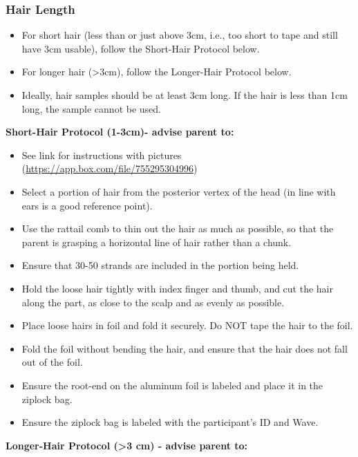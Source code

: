 \documentclass[
]{book}
\providecommand{\tightlist}{%
  \setlength{\itemsep}{0pt}\setlength{\parskip}{0pt}}
\begin{document}
\hypertarget{hair-length-1}{%
\subsubsection{Hair Length}\label{hair-length-1}}

\begin{itemize}
\tightlist
\item
  For short hair (less than or just above 3cm, i.e., too short to tape and still have 3cm usable), follow the Short-Hair Protocol below.
\item
  For longer hair (\textgreater3cm), follow the Longer-Hair Protocol below.
\item
  Ideally, hair samples should be at least 3cm long. If the hair is less than 1cm long, the sample cannot be used.
\end{itemize}

\textbf{Short-Hair Protocol (1-3cm)- advise parent to:}

\begin{itemize}
\tightlist
\item
  See link for instructions with pictures (\url{https://app.box.com/file/755295304996})
\item
  Select a portion of hair from the posterior vertex of the head (in line with ears is a good reference point).
\item
  Use the rattail comb to thin out the hair as much as possible, so that the parent is grasping a horizontal line of hair rather than a chunk.
\item
  Ensure that 30-50 strands are included in the portion being held.
\item
  Hold the loose hair tightly with index finger and thumb, and cut the hair along the part, as close to the scalp and as evenly as possible.
\item
  Place loose hairs in foil and fold it securely. Do NOT tape the hair to the foil.
\item
  Fold the foil without bending the hair, and ensure that the hair does not fall out of the foil.
\item
  Ensure the root-end on the aluminum foil is labeled and place it in the ziplock bag.
\item
  Ensure the ziplock bag is labeled with the participant's ID and Wave.
\end{itemize}

\textbf{Longer-Hair Protocol (\textgreater3 cm) - advise parent to:}
\end{document}
